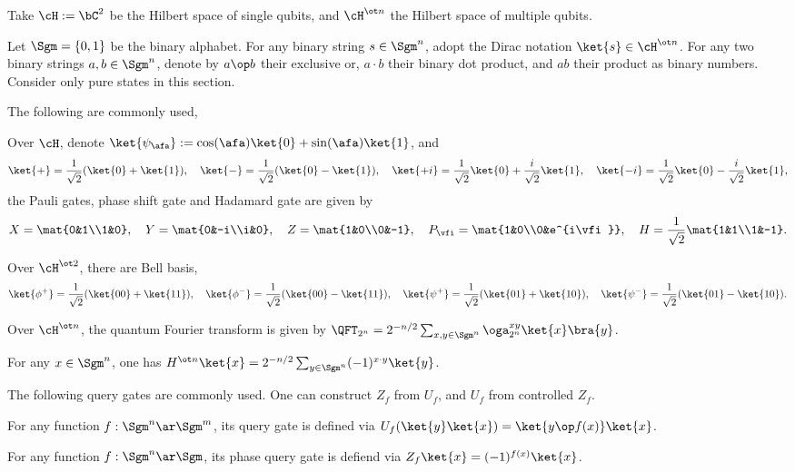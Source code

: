 \documentclass[article, a4paper, twoside]{universal}
\begin{document}
\confighead{}{}{}



\begin{stp}
    Take $\cH:=\bC^{2}$ be the Hilbert space of single qubits, and $\cH^{\ot n}$ the Hilbert space of multiple qubits.

    Let $\Sgm=\{0,1\}$ be the binary alphabet. For any binary string $s\in\Sgm^{n}$, adopt the Dirac notation $\ket{s}\in\cH^{\ot n}$. For any two binary strings $a,b\in\Sgm^{n}$, denote by $a\op b$ their exclusive or, $a\cdot b$ their binary dot product, and $ab$ their product as binary numbers. Consider only pure states in this section.
\end{stp}

\begin{fct}
    The following are commonly used,
    \begin{itm}
        \item Over $\cH$, denote $\ket{\psi_{\afa}}:=\cos(\afa)\ket{0}+\sin(\afa)\ket{1}$, and
        \[
            \ket{+}=\frac{1}{\sqrt{2}}(\ket{0}+\ket{1}),\quad \ket{-}=\frac{1}{\sqrt{2}}(\ket{0}-\ket{1}),\quad \ket{+i}=\frac{1}{\sqrt{2}}\ket{0}+\frac{i}{\sqrt{2}}\ket{1},\quad \ket{-i}=\frac{1}{\sqrt{2}}\ket{0}-\frac{i}{\sqrt{2}}\ket{1},
        \]
        the Pauli gates, phase shift gate and Hadamard gate are given by
        \[
            X=\mat{0&1\\1&0},\quad Y=\mat{0&-i\\i&0},\quad Z=\mat{1&0\\0&-1},\quad P_{\vfi}=\mat{1&0\\0&e^{i\vfi}},\quad H=\frac{1}{\sqrt{2}}\mat{1&1\\1&-1}.
        \]
        \item Over $\cH^{\ot 2}$, there are Bell basis,
        \[
            \ket{\phi^{+}}=\frac{1}{\sqrt{2}}(\ket{00}+\ket{11}),\quad \ket{\phi^{-}}=\frac{1}{\sqrt{2}}(\ket{00}-\ket{11}),\quad \ket{\psi^{+}}=\frac{1}{\sqrt{2}}(\ket{01}+\ket{10}),\quad \ket{\psi^{-}}=\frac{1}{\sqrt{2}}(\ket{01}-\ket{10}).
        \]
        \item Over $\cH^{\ot n}$, the quantum Fourier transform is given by $\QFT_{2^{n}}=2^{-n/2}\sum_{x,y\in\Sgm^{n}}\oga_{2^{n}}^{xy}\ket{x}\bra{y}$.
        \item For any $x\in\Sgm^{n}$, one has $H^{\ot n}\ket{x}=2^{-n/2}\sum_{y\in\Sgm^{n}}(-1)^{x\cdot y}\ket{y}$.
    \end{itm}

    The following query gates are commonly used. One can construct $Z_{f}$ from $U_{f}$, and $U_{f}$ from controlled $Z_{f}$.
    \begin{itm}
        \item For any function $f:\Sgm^{n}\ar\Sgm^{m}$, its query gate is defined via $U_{f}(\ket{y}\ket{x})=\ket{y\op f(x)}\ket{x}$.
        \item For any function $f:\Sgm^{n}\ar\Sgm$, its phase query gate is defiend via $Z_{f}\ket{x}=(-1)^{f(x)}\ket{x}$.
    \end{itm}

\end{fct}
\end{document}
